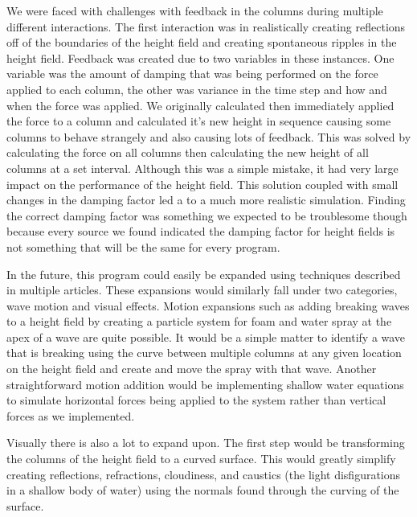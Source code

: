 \documentclass[11pt]{article}
\begin{document}
We were faced with challenges with feedback in the columns during multiple 
different interactions. The first interaction was in realistically creating 
reflections off of the boundaries of the height field and creating spontaneous 
ripples in the height field. Feedback was created due to two variables in these 
instances. One variable was the amount of damping that was being performed on 
the force applied to each column, the other was variance in the time step and 
how and when the force was applied. We originally calculated then immediately 
applied the force to a column and calculated it's new height in sequence 
causing some columns to behave strangely and also causing lots of feedback. 
This was solved by calculating the force on all columns then calculating the 
new height of all columns at a set interval. Although this was a simple 
mistake, it had very large impact on the performance of the height field. This 
solution coupled with small changes in the damping factor led a to a much more 
realistic simulation. Finding the correct damping factor was something we 
expected to be troublesome though because every source we found indicated the 
damping factor for height fields is not something that will be the same for 
every program.

In the future, this program could easily be expanded using techniques described 
in multiple articles. These expansions would similarly fall under two 
categories, wave motion and visual effects. Motion expansions such as adding 
breaking waves to a height field by creating a particle system for foam and 
water spray at the apex of a wave are quite possible. It would be a simple 
matter to identify a wave that is breaking using the curve between multiple 
columns at any given location on the height field and create and move the spray 
with that wave. Another straightforward motion addition would be implementing 
shallow water equations to simulate horizontal forces being applied to the 
system rather than vertical forces as we implemented.

Visually there is also a lot to expand upon. The first step would be 
transforming the columns of the height field to a curved surface. This would 
greatly simplify creating reflections, refractions, cloudiness, and caustics 
(the light disfigurations in a shallow body of water) using the normals found 
through the curving of the surface.

\nocite{*}
\printbibliography
\end{document}
